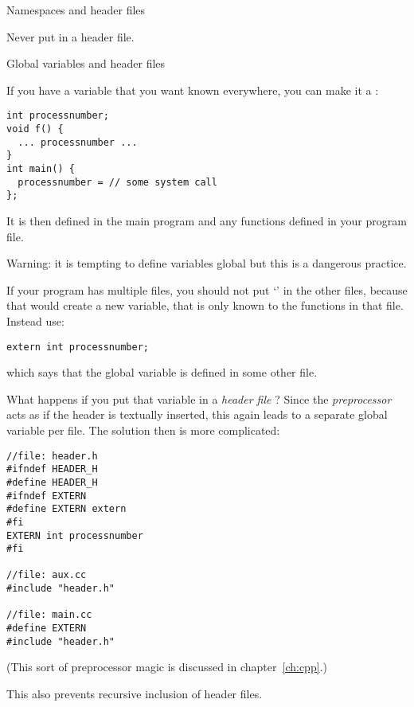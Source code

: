  {Namespaces and header files}

Never put  in a header file.

 {Global variables and header files}
\label{ex:globalvar}

If you have a variable that you want known everywhere, you can make it
a :
\begin{verbatim}
int processnumber;
void f() {
  ... processnumber ...
}
int main() {
  processnumber = // some system call
};
\end{verbatim}
It is then defined in the main program and any functions defined in your program file.

Warning: it is tempting to define variables global but this is a
dangerous practice.

If your program has multiple files, you should not put `'
in the other files, because that would create a new variable, that is
only known to the functions in that file. Instead use:
\begin{verbatim}
extern int processnumber;
\end{verbatim}
which says that the global variable  is defined in
some other file.

What happens if you put that variable in a
%
\emph{header file}%
%
? Since the
%
\emph{preprocessor}%
acts as if the header is textually inserted, this again leads to
a separate global variable per file. The solution then is more
complicated:
\begin{verbatim}
//file: header.h
#ifndef HEADER_H
#define HEADER_H
#ifndef EXTERN
#define EXTERN extern
#fi
EXTERN int processnumber
#fi

//file: aux.cc
#include "header.h"

//file: main.cc
#define EXTERN
#include "header.h"
\end{verbatim}
(This sort of preprocessor magic is discussed in chapter~\ref{ch:cpp}.)

This also prevents recursive inclusion of header files.

